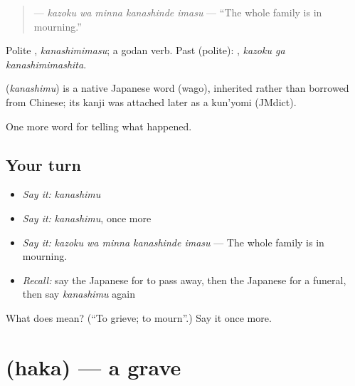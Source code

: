 \begin{quote}
\textbf{  } — \emph{kazoku wa minna kanashinde imasu} — \textquotedblleft{}The whole family is in mourning.\textquotedblright{}
\end{quote}

Polite \textbf{}, \emph{kanashimimasu}; a godan verb. Past (polite): \textbf{ }, \emph{kazoku ga kanashimimashita}.

\begin{cousinweb}
\textbf{} (\emph{kanashimu}) is a native Japanese word (wago), inherited rather than borrowed from Chinese; its kanji was attached later as a kun'yomi (JMdict).
\end{cousinweb}

\begin{grammarlens}[title={What you've built}]
One more word for telling what happened.
\end{grammarlens}

\subsection*{Your turn}
\begin{itemize}
\raggedright
  \item \emph{Say it:} \emph{kanashimu}
  \item \emph{Say it:} \emph{kanashimu}, once more
  \item \emph{Say it:} \emph{kazoku wa minna kanashinde imasu} — The whole family is in mourning.
  \item \emph{Recall:} say the Japanese for to pass away, then the Japanese for a funeral, then say \emph{kanashimu} again
\end{itemize}

\begin{tcolorbox}[breakable,colback=teal!4,colframe=teal!35!black,title={Before you move on}]
What does  mean? (\textquotedblleft{}To grieve; to mourn\textquotedblright{}.) Say it once more.
\end{tcolorbox}
\section[\texorpdfstring{\ja{はか} (haka)}{はか (haka)}]{ (haka) — a grave}

\label{lesson:JA-C291-haka}



